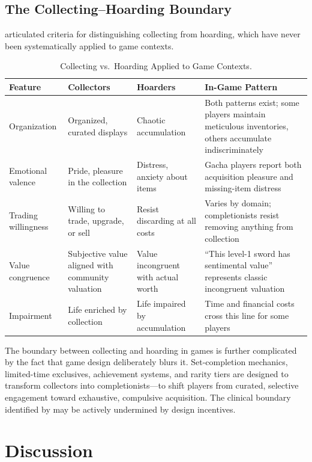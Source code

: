 \documentclass[12pt]{article}
\begin{document}
\subsection{The Collecting--Hoarding Boundary}

\citet{Nordsletten2012} articulated criteria for distinguishing collecting from hoarding, which have never been systematically applied to game contexts.

\begin{table}[ht]
\centering
\caption{Collecting vs.\ Hoarding Applied to Game Contexts.}
\small
\begin{tabular}{p{2.5cm}p{2.5cm}p{2.5cm}p{5cm}}
\toprule
Feature & Collectors & Hoarders & In-Game Pattern \\
\midrule
Organization & Organized, curated displays & Chaotic accumulation & Both patterns exist; some players maintain meticulous inventories, others accumulate indiscriminately \\
Emotional valence & Pride, pleasure in the collection & Distress, anxiety about items & Gacha players report both acquisition pleasure and missing-item distress \citep{Sanmartin2023} \\
Trading willingness & Willing to trade, upgrade, or sell & Resist discarding at all costs & Varies by domain; completionists resist removing anything from collection \\
Value congruence & Subjective value aligned with community valuation & Value incongruent with actual worth & ``This level-1 sword has sentimental value'' represents classic incongruent valuation \\
Impairment & Life enriched by collection & Life impaired by accumulation & Time and financial costs cross this line for some players \citep{Tang2022, Inaguma2024} \\
\bottomrule
\end{tabular}
\end{table}

The boundary between collecting and hoarding in games is further complicated by the fact that game design deliberately blurs it. Set-completion mechanics, limited-time exclusives, achievement systems, and rarity tiers are designed to transform collectors into completionists---to shift players from curated, selective engagement toward exhaustive, compulsive acquisition. The clinical boundary identified by \citet{Nordsletten2012} may be actively undermined by design incentives.

\section{Discussion}
\end{document}
